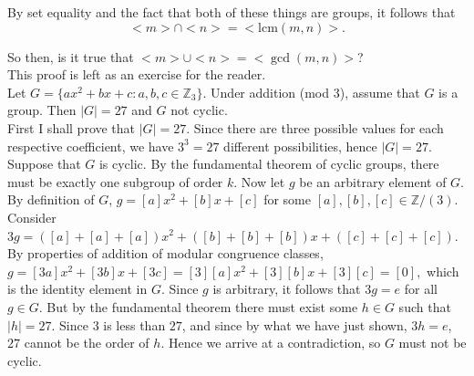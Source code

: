 \documentclass{article}
\newcommand{\lcm}{\mbox{lcm}}
\newcommand{\Z}{\mathbb{Z}}
\begin{document}
By set equality and the fact that both of these things are groups, it follows that $$<m>\cap<n> = <\lcm(m,n)>.$$

 So then, is it true that $<m>\cup<n> = <\gcd(m,n)>$?\\ 
 This proof is left as an exercise for the reader.\\


 Let $G = \{ax^2 + bx + c : a,b,c\in \Z_3\}$. Under addition (mod 3), assume that $G$ is a group. Then $|G| = 27$ and $G$ not cyclic.\\
 First I shall prove that $|G| = 27$. Since there are three possible values for each respective coefficient, we have $3^3 = 27$ different possibilities, hence $|G| = 27$.\\
Suppose that $G$ is cyclic. By the fundamental theorem of cyclic groups, there must be exactly one subgroup of order $k$. Now let $g$ be an arbitrary element of $G$. By definition of $G$, $g = [a]x^2 + [b]x + [c]$ for some $[a],[b],[c]\in \Z/(3)$. Consider $3g = ([a]+[a]+[a])x^2 + ([b]+[b]+[b])x + ([c]+[c]+[c])$. By properties of addition of modular congruence classes, $g = [3a]x^2 + [3b]x + [3c] = [3][a]x^2 + [3][b]x + [3][c] = [0],$ which is the identity element in $G$. Since $g$ is arbitrary, it follows that $3g = e$ for all $g\in G$. But by the fundamental theorem there must exist some $h\in G$ such that $|h| = 27$. Since $3$ is less than $27$, and since by what we have just shown, $3h = e$, $27$ cannot be the order of $h$. Hence we arrive at a contradiction, so $G$ must not be cyclic.
\end{document}
